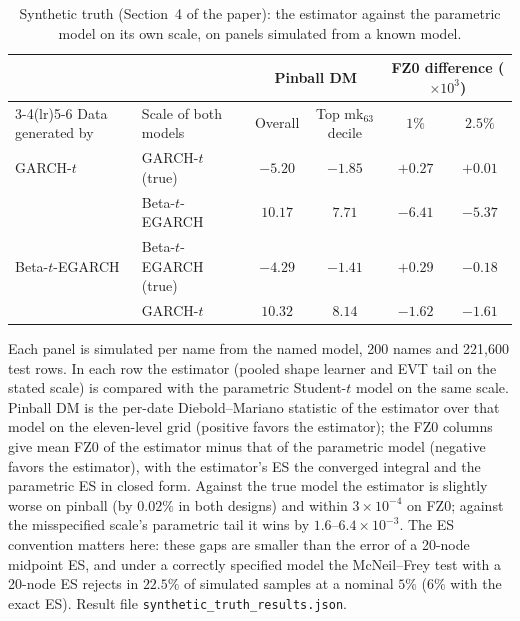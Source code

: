 \documentclass[11pt]{article}
\begin{document}
\begin{table}[htbp]
\centering
\begin{threeparttable}
\caption{Synthetic truth (Section~4 of the paper): the estimator against the parametric model on its own scale, on panels simulated from a known model.}
\label{tab:synth}
\scriptsize\setlength{\tabcolsep}{4pt}
\begin{tabular}{llcccc}
\toprule
& & \multicolumn{2}{c}{Pinball DM} & \multicolumn{2}{c}{FZ0 difference ($\times10^{3}$)} \\
\cmidrule(lr){3-4}\cmidrule(lr){5-6}
Data generated by & Scale of both models & Overall & Top mk$_{63}$ decile & $1\%$ & $2.5\%$ \\
\midrule
GARCH-$t$ & GARCH-$t$ (true) & $-5.20$ & $-1.85$ & $+0.27$ & $+0.01$ \\
 & Beta-$t$-EGARCH & $10.17$ & $7.71$ & $-6.41$ & $-5.37$ \\
Beta-$t$-EGARCH & Beta-$t$-EGARCH (true) & $-4.29$ & $-1.41$ & $+0.29$ & $-0.18$ \\
 & GARCH-$t$ & $10.32$ & $8.14$ & $-1.62$ & $-1.61$ \\
\bottomrule
\end{tabular}
\begin{tablenotes}\footnotesize
\item Each panel is simulated per name from the named model, 200 names and 221,600 test rows. In each row the estimator (pooled shape learner and EVT tail on the stated scale) is compared with the parametric Student-$t$ model on the same scale. Pinball DM is the per-date Diebold--Mariano statistic of the estimator over that model on the eleven-level grid (positive favors the estimator); the FZ0 columns give mean FZ0 of the estimator minus that of the parametric model (negative favors the estimator), with the estimator's ES the converged integral and the parametric ES in closed form. Against the true model the estimator is slightly worse on pinball (by $0.02\%$ in both designs) and within $3\times10^{-4}$ on FZ0; against the misspecified scale's parametric tail it wins by $1.6$--$6.4\times10^{-3}$. The ES convention matters here: these gaps are smaller than the error of a 20-node midpoint ES, and under a correctly specified model the McNeil--Frey test with a 20-node ES rejects in $22.5\%$ of simulated samples at a nominal $5\%$ ($6\%$ with the exact ES). Result file \texttt{synthetic\_truth\_results.json}.
\end{tablenotes}
\end{threeparttable}
\end{table}
\end{document}
